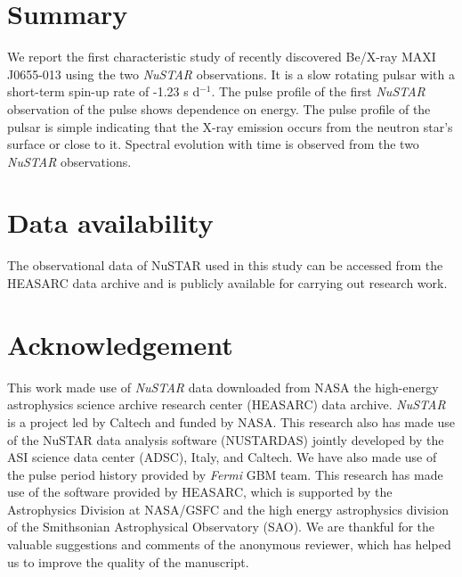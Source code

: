 \documentclass[12pt,a4paper,fleqn,usenatbib]{mnras}
\begin{document}
\section*{Summary}
 We report the first characteristic study of recently discovered Be/X-ray MAXI J0655-013 using the two \emph{NuSTAR} observations. It is a slow rotating pulsar with a  short-term spin-up rate of -1.23 s d$^{-1}$. The pulse profile of the first \emph{NuSTAR} observation of the pulse shows dependence on energy. The pulse profile of the pulsar is simple indicating that the X-ray emission occurs from the neutron star's surface or close to it. Spectral evolution with time is observed from the two \emph{NuSTAR} observations.
 
 \section*{Data availability}
 
 The observational data of NuSTAR used in this study can be accessed from the HEASARC data archive and is publicly available for carrying out research work. 


\section*{Acknowledgement}

This work made use of \emph{NuSTAR} data downloaded from NASA the high-energy astrophysics science archive research center (HEASARC) data archive. \emph{NuSTAR} is a project led by Caltech and funded by NASA. This research also has made use of the NuSTAR data analysis software (NUSTARDAS) jointly developed by the ASI science data center (ADSC), Italy, and Caltech. We have also made use of the pulse period history provided by \emph{Fermi} GBM team. This research has made use of the software provided by HEASARC, which is supported by the Astrophysics Division at NASA/GSFC and the high energy astrophysics division of the Smithsonian Astrophysical Observatory (SAO). We are thankful for the valuable suggestions and comments of the anonymous reviewer, which has helped us to improve the quality of the manuscript.





\end{document}
